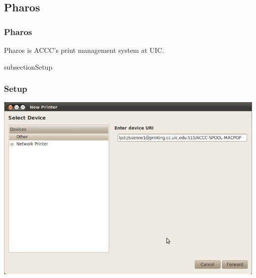 \documentclass[hyperref={pdfpagelabels=false}]{beamer}
\begin{document}
\subsection{Pharos}
\frame
{
    \frametitle{Pharos}
    Pharos is ACCC's print management system at UIC.
}
subsection{Setup}
\frame
{
    \frametitle{Setup}
     \includegraphics[totalheight=0.8\textheight]{PrinterURI.png}
}
\end{document}
